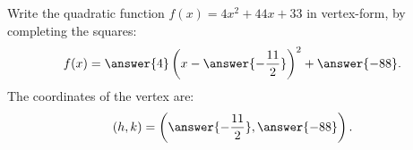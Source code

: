 \documentclass{ximera}
\author{Ivo Terek}
\begin{document}
\begin{exercise}
Write the quadratic function $f(x) = 4x^2 + 44x + 33$ in vertex-form, by completing the squares: $$f(x) = \answer{4}\left(x-\answer{-\frac{11}{2}}\right)^2+\answer{-88}.$$
The coordinates of the vertex are: $$(h,k) = \left(\answer{-\frac{11}{2}},\answer{-88}\right).$$
\end{exercise}
\end{document}
